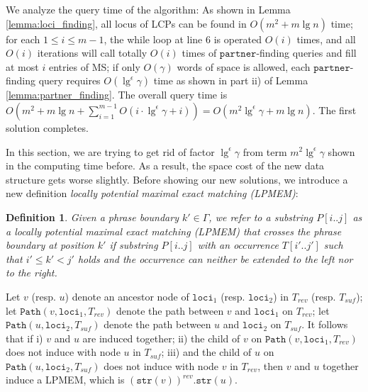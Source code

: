 \documentclass[smallabstract,smallcaptions]{dccpaper}
\newtheorem{definition}{Definition}
\def\idtt#1{\ensuremath{\mathtt{#1}}}
\def\str{\idtt{str}}
\def\partner{\idtt{partner}}
\def\path{\idtt{Path}}
\def\loci{\idtt{loci}}
\begin{document}
We analyze the query time of the algorithm:
As shown in Lemma \ref{lemma:loci_finding}, all locus of LCPs can be found in $O(m^2+m\lg n)$ time; for each $1\leq i\leq m-1$, the while loop at line 6 is operated $O(i)$ times, and all $O(i)$ iterations will call totally $O(i)$ times of $\partner$-finding queries and fill at most $i$ entries of MS; if only $O(\gamma)$ words of space is allowed, each $\partner$-finding query requires $O(\lg^{\epsilon} \gamma)$ time as shown in part ii) of Lemma \ref{lemma:partner_finding}.
The overall query time is $O(m^2+m\lg n+\sum_{i=1}^{m-1} O(i \cdot \lg^{\epsilon} \gamma+i))=O(m^2\lg^{\epsilon} \gamma+ m\lg n)$. The first solution completes.


\label{sect: future}
In this section, we are trying to get rid of factor $\lg^{\epsilon} \gamma$ from term $m^2\lg^{\epsilon} \gamma$ shown in the computing time before.
As a result, the space cost of the new data structure gets worse slightly.
Before showing our new solutions, we introduce a new definition {\em locally potential maximal exact matching (LPMEM)}:


\begin{definition}
	\label{def:LPMEM}
	Given a phrase boundary $k'\in \Gamma$, we refer to a substring $P[i..j]$ as a locally potential maximal exact matching (LPMEM) that crosses the phrase boundary at position $k'$ if substring $P[i..j]$ with an occurrence $T[i'..j']$ such that $i'\leq k'<j'$ holds and the occurrence can neither be extended to the left nor to the right.
\end{definition}

Let $v$ (resp. $u$) denote an ancestor node of $\loci_1$ (resp. $\loci_2$)  in $T_{rev}$ (resp. $T_{suf}$); let $\path(v, \loci_1, T_{rev})$ denote the path between $v$ and $\loci_1$ on $T_{rev}$; let $\path(u, \loci_2, T_{suf})$ denote the path between $u$ and $\loci_2$ on $T_{suf}$. It follows that if i) $v$ and $u$ are induced together; ii) the child of $v$ on $\path(v, \loci_1, T_{rev})$ does not induce with node $u$ in $T_{suf}$; iii) and the child of $u$ on $\path(u, \loci_2, T_{suf})$ does not induce with node $v$ in $T_{rev}$, then $v$ and $u$ together induce a LPMEM, which is $(\str(v))^{rev}.\str(u)$.
\end{document}
